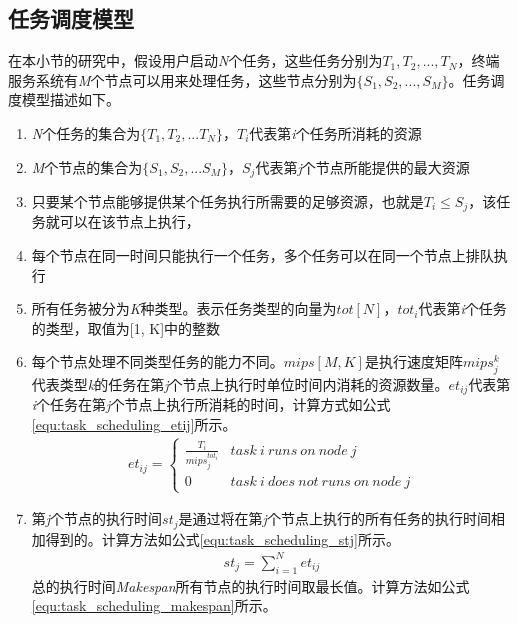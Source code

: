 \subsection{任务调度模型}
在本小节的研究中，假设用户启动\emph{N}个任务，这些任务分别为${T_1,T_2,...,T_N}$，终端服务系统有\emph{M}个节点可以用来处理任务，这些节点分别为$\{S_1,S_2,...,S_M\}$。任务调度模型描述如下。
\begin{enumerate}[]
    \item \emph{N}个任务的集合为$\{T_1,T_2,...T_N\}$，$T_i$代表第\emph{i}个任务所消耗的资源
    \item \emph{M}个节点的集合为$\{S_1,S_2,...S_M\}$，$S_j$代表第\emph{j}个节点所能提供的最大资源
    \item 只要某个节点能够提供某个任务执行所需要的足够资源，也就是$T_i \leq S_j$，该任务就可以在该节点上执行，
    \item 每个节点在同一时间只能执行一个任务，多个任务可以在同一个节点上排队执行
    \item 所有任务被分为\emph{K}种类型。表示任务类型的向量为$tot[N]$，$tot_i$代表第\emph{i}个任务的类型，取值为[1, K]中的整数
    \item 每个节点处理不同类型任务的能力不同。$mips[M,K]$是执行速度矩阵$mips_{j}^{k}$ 代表类型\emph{k}的任务在第\emph{j}个节点上执行时单位时间内消耗的资源数量。$et_{ij}$代表第\emph{i}个任务在第\emph{j}个节点上执行所消耗的时间，计算方式如公式\ref{equ:task_scheduling_etij}所示。
    \begin{eqnarray}\label{equ:task_scheduling_etij}
        et_{ij}= \begin{cases}
            \frac{T_i}{mips_{j}^{tot_i}} & task\  i\  runs\  on\  node\  j \\
            0&task\  i\  does\  not\  runs\  on\  node\  j 
            \end{cases} 
    \end{eqnarray}
    \item 第\emph{j}个节点的执行时间$st_j$是通过将在第\emph{j}个节点上执行的所有任务的执行时间相加得到的。计算方法如公式\ref{equ:task_scheduling_stj}所示。
    \begin{eqnarray}\label{equ:task_scheduling_stj}
        st_{j}=\sum_{i=1}^{N} et_{ij}
    \end{eqnarray}
    总的执行时间\emph{Makespan}所有节点的执行时间取最长值。计算方法如公式\ref{equ:task_scheduling_makespan}所示。

\end{enumerate}
